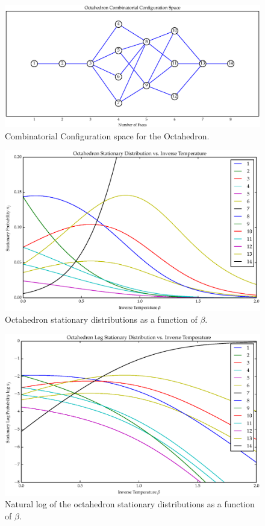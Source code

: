 \begin{figure}[ht]
\label{fig:OctaCCS}
\centering
  \includegraphics[scale=0.6]{images/octahedron_ccs.eps}
\caption{Combinatorial Configuration space for the Octahedron.}
\end{figure}

\begin{figure}[ht]
\label{fig:OctaPi}
\centering
  \includegraphics[scale=0.6]{images/octahedron_pi.eps}
\caption{Octahedron stationary distributions as a function of $\beta$.}
\end{figure}

\begin{figure}[ht]
\label{fig:OctaLogPi}
\centering
  \includegraphics[scale=0.6]{images/octahedron_log_pi.eps}
\caption{Natural log of the octahedron stationary distributions as a function of $\beta$.}
\end{figure}

